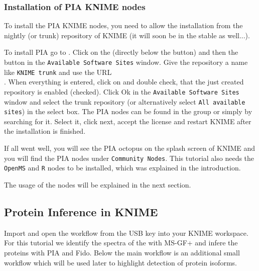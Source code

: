 \subsubsection{Installation of PIA KNIME nodes}
To install the PIA KNIME nodes, you need to allow the installation from the nightly (or trunk) repository of KNIME (it will soon be in the stable as well...).

To install PIA go to . Click on the  (directly below the  button) and then the  button in the \texttt{Available Software Sites} window. Give the repository a name like \texttt{KNIME trunk} and use the URL \\. When everything is entered, click on  and double check, that the just created repository is enabled (checked). Click Ok in the \texttt{Available Software Sites} window and select the trunk repository (or alternatively select \texttt{All available sites}) in the select box. The PIA nodes can be found in the  group or simply by searching for it. Select it, click next, accept the license and restart KNIME after the installation is finished.

If all went well, you will see the PIA octopus on the splash screen of KNIME and you will find the PIA nodes under \texttt{Community Nodes}. This tutorial also needs the \texttt{OpenMS} and \texttt{R} nodes to be installed, which was explained in the introduction.

The usage of the nodes will be explained in the next section.


\subsection{Protein Inference in KNIME}
Import and open the workflow  from the USB key into your KNIME workspace. For this tutorial we identify the spectra of the  with MS-GF+ and infere the proteins with PIA and Fido. Below the main workflow is an additional small workflow which will be used later to highlight detection of protein isoforms.
 

